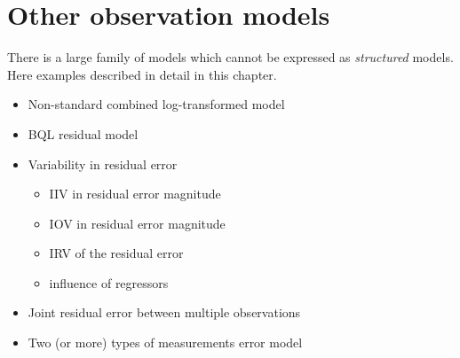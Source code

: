 
\chapter{Other observation models}
\label{ch:otherModels}

There is a large family of models which cannot be expressed as 
\emph{structured} models. Here examples described in detail in 
this chapter.

\begin{itemize}
\item 
Non-standard combined log-transformed model
\item 
BQL residual model
\item 
Variability in residual error 
\begin{itemize}
\item 
IIV in residual error magnitude 
\item 
IOV in residual error magnitude 
\item 
IRV of the residual error 
\item 
influence of regressors
\end{itemize}
\item 
Joint residual error between multiple observations 
\item 
Two (or more) types of measurements error model 
\end{itemize}



